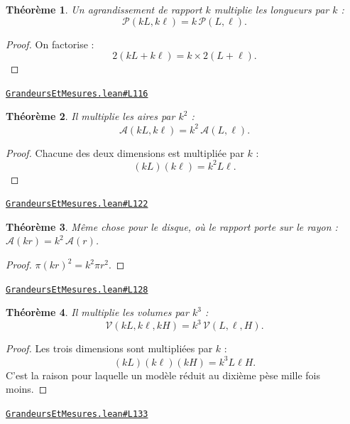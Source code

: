 \documentclass[11pt,a4paper]{article}
\theoremstyle{definition}
\theoremstyle{plain}
\newtheorem{theoreme}{Théorème}
\newcommand{\source}[2]{\par\smallskip\noindent\hfill{\footnotesize\href{#1}{\texttt{#2}}}\par\smallskip}
\begin{document}
\begin{theoreme}
Un agrandissement de rapport $k$ multiplie les longueurs par $k$ :
\[ \mathcal{P}(kL, k\ell) = k\,\mathcal{P}(L, \ell) . \]
\end{theoreme}

\begin{proof}
On factorise :
\[ 2(kL + k\ell) = k \times 2(L + \ell) . \]
\end{proof}
\source{https://github.com/Commutator-IO/learn-lean/blob/main/cours/01-college/04-grandeurs-et-mesures/GrandeursEtMesures.lean\#L116}{GrandeursEtMesures.lean\#L116}

\begin{theoreme}
Il multiplie les aires par $k^2$ :
\[ \mathcal{A}(kL, k\ell) = k^2\,\mathcal{A}(L, \ell) . \]
\end{theoreme}

\begin{proof}
Chacune des deux dimensions est multipliée par $k$ :
\[ (kL)(k\ell) = k^2 L\ell . \]
\end{proof}
\source{https://github.com/Commutator-IO/learn-lean/blob/main/cours/01-college/04-grandeurs-et-mesures/GrandeursEtMesures.lean\#L122}{GrandeursEtMesures.lean\#L122}

\begin{theoreme}
Même chose pour le disque, où le rapport porte sur le rayon :
$\mathcal{A}(kr) = k^2\,\mathcal{A}(r)$.
\end{theoreme}

\begin{proof}
$\pi (kr)^2 = k^2 \pi r^2$.
\end{proof}
\source{https://github.com/Commutator-IO/learn-lean/blob/main/cours/01-college/04-grandeurs-et-mesures/GrandeursEtMesures.lean\#L128}{GrandeursEtMesures.lean\#L128}

\begin{theoreme}
Il multiplie les volumes par $k^3$ :
\[ \mathcal{V}(kL, k\ell, kH) = k^3\,\mathcal{V}(L, \ell, H) . \]
\end{theoreme}

\begin{proof}
Les trois dimensions sont multipliées par $k$ :
\[ (kL)(k\ell)(kH) = k^3 L\ell H . \]
C'est la raison pour laquelle un modèle réduit au dixième pèse mille fois moins.
\end{proof}
\source{https://github.com/Commutator-IO/learn-lean/blob/main/cours/01-college/04-grandeurs-et-mesures/GrandeursEtMesures.lean\#L133}{GrandeursEtMesures.lean\#L133}
\end{document}
